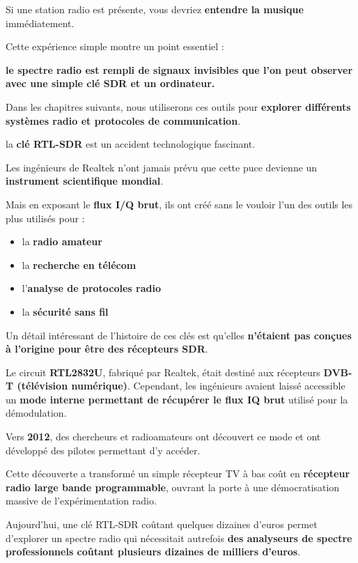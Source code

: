 \documentclass[
  french,
]{article}
\providecommand{\tightlist}{%
  \setlength{\itemsep}{0pt}\setlength{\parskip}{0pt}}
\begin{document}
Si une station radio est présente, vous devriez \textbf{entendre la
musique} immédiatement.

Cette expérience simple montre un point essentiel :

\textbf{le spectre radio est rempli de signaux invisibles que l'on peut
observer avec une simple clé SDR et un ordinateur.}

Dans les chapitres suivants, nous utiliserons ces outils pour
\textbf{explorer différents systèmes radio et protocoles de
communication}.

la \textbf{clé RTL-SDR} est un accident technologique fascinant.

Les ingénieurs de Realtek n'ont jamais prévu que cette puce devienne un
\textbf{instrument scientifique mondial}.

Mais en exposant le \textbf{flux I/Q brut}, ils ont créé sans le vouloir
l'un des outils les plus utilisés pour :

\begin{itemize}
\tightlist
\item
  la \textbf{radio amateur}
\item
  la \textbf{recherche en télécom}
\item
  l'\textbf{analyse de protocoles radio}
\item
  la \textbf{sécurité sans fil}
\end{itemize}

Un détail intéressant de l'histoire de ces clés est qu'elles
\textbf{n'étaient pas conçues à l'origine pour être des récepteurs SDR}.

Le circuit \textbf{RTL2832U}, fabriqué par Realtek, était destiné aux
récepteurs \textbf{DVB-T (télévision numérique)}. Cependant, les
ingénieurs avaient laissé accessible un \textbf{mode interne permettant
de récupérer le flux IQ brut} utilisé pour la démodulation.

Vers \textbf{2012}, des chercheurs et radioamateurs ont découvert ce
mode et ont développé des pilotes permettant d'y accéder.

Cette découverte a transformé un simple récepteur TV à bas coût en
\textbf{récepteur radio large bande programmable}, ouvrant la porte à
une démocratisation massive de l'expérimentation radio.

Aujourd'hui, une clé RTL-SDR coûtant quelques dizaines d'euros permet
d'explorer un spectre radio qui nécessitait autrefois \textbf{des
analyseurs de spectre professionnels coûtant plusieurs dizaines de
milliers d'euros}.
\end{document}
